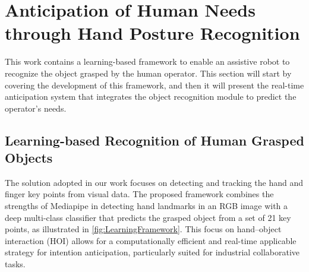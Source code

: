 \section{Anticipation of Human Needs through Hand Posture Recognition}
\label{section:human_intention_anticipation}

This work contains a learning-based framework to enable an assistive robot to recognize the object grasped by the human operator. This section will start by covering the development of this framework, and then it will present the real-time anticipation system that integrates the object recognition module to predict the operator's needs.

\subsection{Learning-based Recognition of Human Grasped\\Objects}
\label{subsection:proposal_overview}

The solution adopted in our work focuses on detecting and tracking the hand and finger key points from visual data. The proposed framework combines the strengths of Mediapipe in detecting hand landmarks in an RGB image with a deep multi-class classifier that predicts the grasped object from a set of 21 key points, as illustrated in \autoref{fig:LearningFramework}. This focus on hand–object interaction (HOI) allows for a computationally efficient and real-time applicable strategy for intention anticipation, particularly suited for industrial collaborative tasks.

